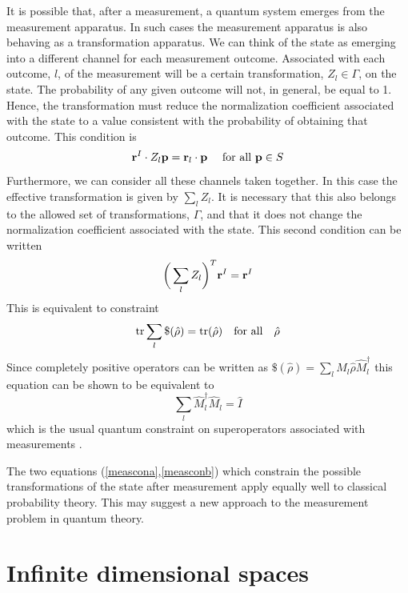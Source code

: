 \documentclass[12pt]{article}
\begin{document}
It is possible that, after a measurement, a quantum system emerges from
the measurement apparatus.  In such cases the measurement apparatus is
also behaving as a transformation apparatus. We can think of the state
as emerging into a different channel for each measurement outcome.
Associated with each
outcome, $l$, of the measurement will be a certain transformation,
$Z_l\in \Gamma$, on the state.
The probability of any given outcome will not, in
general, be equal to 1.  Hence, the transformation must reduce the
normalization coefficient associated with the state to a value
consistent with the probability of obtaining that outcome.  This
condition is
\begin{equation}\label{meascona}
{\bf r}^I\cdot Z_l {\bf p} = {\bf r}_l\cdot{\bf p} ~~~~{\rm for~all~}
{\bf p}\in S
\end{equation}
Furthermore, we can consider all these channels taken together.  In this
case the effective transformation is given by $\sum_l Z_l$.  It is
necessary that this also belongs to the allowed set of transformations,
$\Gamma$, and that it does not change the normalization coefficient
associated with the state.  This second condition can be written
\begin{equation}\label{measconb}
\bigg(\sum_l Z_l\bigg)^T {\bf r}^I ={\bf r}^I
\end{equation}
This is equivalent to constraint
\begin{equation}
{\rm tr}\sum_l \$ (\hat{\rho}) = {\rm tr}(\hat{\rho}) ~~~{\rm
for~all}~~~\hat{\rho}
\end{equation}
Since completely positive operators can be written as
$\$(\hat{\rho})=\sum_l \hat{M}_l\hat{\rho}\hat{M}_l^\dagger $ this
equation can be shown to be equivalent to
\begin{equation}
\sum_l \hat{M}_l^\dagger \hat{M}_l = \hat{I}
\end{equation}
which is the usual quantum constraint on superoperators associated with
measurements \cite{krauss,Nielsenchuang}.

The two equations (\ref{meascona},\ref{measconb}) which constrain the
possible transformations of the state after measurement apply equally
well to classical probability theory.  This may suggest a new approach
to the measurement problem in quantum theory.

\section{Infinite dimensional spaces}
\end{document}
